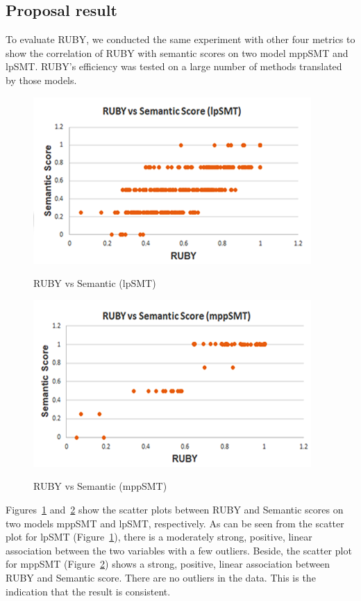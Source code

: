 \subsection{Proposal result}

To evaluate RUBY, we conducted the same experiment with other four
metrics to show the correlation of RUBY with semantic scores on two
model mppSMT and lpSMT. RUBY's efficiency was tested on a large number
of methods translated by those models. 

\begin{figure}[t]
\caption{RUBY vs Semantic (lpSMT)}
\centering
\includegraphics{img/rubyvssem_lpSMT.png}
\label{fig:RubySemlpSMT}
\end{figure}

\begin{figure}[t]
\caption{RUBY vs Semantic (mppSMT)}
\centering
\includegraphics{img/rubyvssem_mppSMT.png}
\label{fig:RubySemMppSMT}
\end{figure}

Figures~\ref{fig:RubySemlpSMT} and~\ref{fig:RubySemMppSMT} show the
scatter plots between RUBY and Semantic scores on two models mppSMT
and lpSMT, respectively. As can be seen from the scatter plot for
lpSMT (Figure~\ref{fig:RubySemlpSMT}), there is a moderately strong,
positive, linear association between the two variables with a few
outliers.  Beside, the scatter plot for mppSMT
(Figure~\ref{fig:RubySemMppSMT}) shows a strong, positive, linear
association between RUBY and Semantic score. There are no outliers in
the data. This is the indication that the result is consistent.

